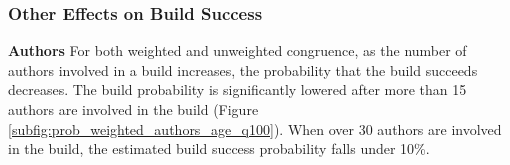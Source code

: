 %





\subsubsection{Other Effects on Build Success}
\label{sec:effectauthors}

\indent\indent
\textbf{Authors} For both weighted and unweighted congruence, as the number of authors involved in a build increases, the probability that the build succeeds decreases. The build probability is significantly lowered after more than 15 authors are involved in the build (Figure \ref{subfig:prob_weighted_authors_age_q100}). When over 30 authors are involved in the build, the estimated build success probability falls under 10\%.

